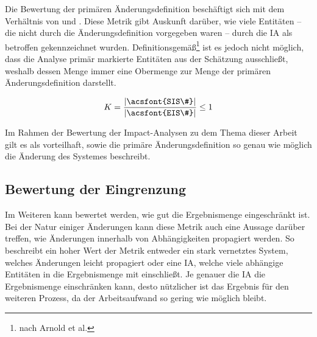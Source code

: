 Die Bewertung der primären Änderungsdefinition beschäftigt sich mit dem Verhältnis von  und . 
Diese Metrik gibt Auskunft darüber, wie viele Entitäten -- die nicht durch die Änderungsdefinition vorgegeben waren -- durch die \ac{IA} als betroffen gekennzeichnet wurden.
Definitionsgemäß\footnote{nach Arnold et al.} ist es jedoch nicht möglich, dass die Analyse primär markierte Entitäten aus der Schätzung ausschließt, weshalb dessen Menge immer eine Obermenge zur Menge der primären Änderungsdefinition darstellt.

$$
    K = \dfrac{|\text{\acsfont{SIS\#}}|}{|\text{\acsfont{EIS\#}}|} \leq 1
$$

Im Rahmen der Bewertung der Impact-Analysen zu dem Thema dieser Arbeit gilt es als vorteilhaft, sowie die primäre Änderungsdefinition so genau wie möglich die Änderung des Systemes beschreibt. 




\pagebreak

\subsection{Bewertung der Eingrenzung}

Im Weiteren kann bewertet werden, wie gut die Ergebnismenge eingeschränkt ist.
Bei der Natur einiger Änderungen kann diese Metrik auch eine Aussage darüber treffen, wie Änderungen innerhalb von Abhängigkeiten propagiert werden. 
So beschreibt ein hoher Wert der Metrik entweder ein stark vernetztes System, welches Änderungen leicht propagiert oder eine \ac{IA}, welche viele abhängige Entitäten in die Ergebnismenge mit einschließt.
Je genauer die \ac{IA} die Ergebnismenge einschränken kann, desto nützlicher ist das Ergebnis für den weiteren Prozess, da der Arbeitsaufwand so gering wie möglich bleibt. 

